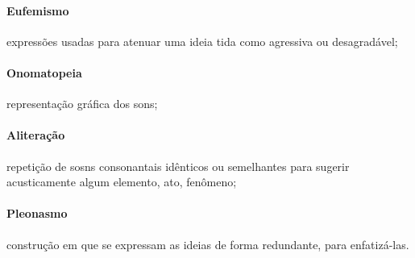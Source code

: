 {\paragraph{Eufemismo} expressões usadas para atenuar uma ideia tida como
agressiva ou desagradável;

\paragraph{Onomatopeia} representação gráfica dos sons;

\paragraph{Aliteração} repetição de sosns consonantais idênticos ou semelhantes para
sugerir acusticamente algum elemento, ato, fenômeno;

\paragraph{Pleonasmo} construção em que se expressam as ideias de forma redundante, para enfatizá-las.}

